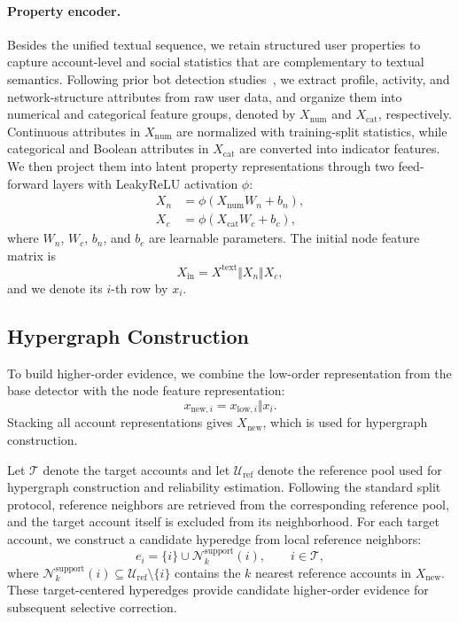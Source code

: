 \paragraph{Property encoder.}
Besides the unified textual sequence, we retain structured user properties to capture account-level and social statistics that are complementary to textual semantics. Following prior bot detection studies~\cite{davis2016botornot,varol2017online,lin2025botbr,gao2025higherorder}, we extract profile, activity, and network-structure attributes from raw user data, and organize them into numerical and categorical feature groups, denoted by $X_{\mathrm{num}}$ and $X_{\mathrm{cat}}$, respectively. Continuous attributes in $X_{\mathrm{num}}$ are normalized with training-split statistics, while categorical and Boolean attributes in $X_{\mathrm{cat}}$ are converted into indicator features. We then project them into latent property representations through two feed-forward layers with LeakyReLU activation $\phi$:
\begin{align}
X_n &= \phi(X_{\mathrm{num}}W_n+b_n),
\label{eq:numerical-property-projection}\\
X_c &= \phi(X_{\mathrm{cat}}W_c+b_c),
\label{eq:categorical-property-projection}
\end{align}
where $W_n$, $W_c$, $b_n$, and $b_c$ are learnable parameters. The initial node feature matrix is
\begin{equation}
X_{\mathrm{in}} = X^{\mathrm{text}} \Vert X_n \Vert X_c ,
\label{eq:node-feature}
\end{equation}
and we denote its $i$-th row by $x_i$.

\subsection{Hypergraph Construction}

To build higher-order evidence, we combine the low-order representation from the base detector with the node feature representation:
\begin{equation}
x_{\mathrm{new},i}=x_{\mathrm{low},i}\Vert x_i .
\label{eq:hybrid-representation}
\end{equation}
Stacking all account representations gives $X_{\mathrm{new}}$, which is used for hypergraph construction.

Let $\mathcal{T}$ denote the target accounts and let $\mathcal{U}_{\mathrm{ref}}$ denote the reference pool used for hypergraph construction and reliability estimation. Following the standard split protocol, reference neighbors are retrieved from the corresponding reference pool, and the target account itself is excluded from its neighborhood. For each target account, we construct a candidate hyperedge from local reference neighbors:
\begin{equation}
e_i=\{i\}\cup \mathcal{N}^{\mathrm{support}}_k(i),\qquad i\in \mathcal{T},
\label{eq:support-hyperedge}
\end{equation}
where $\mathcal{N}^{\mathrm{support}}_k(i)\subseteq \mathcal{U}_{\mathrm{ref}}\setminus\{i\}$ contains the $k$ nearest reference accounts in $X_{\mathrm{new}}$. These target-centered hyperedges provide candidate higher-order evidence for subsequent selective correction.

